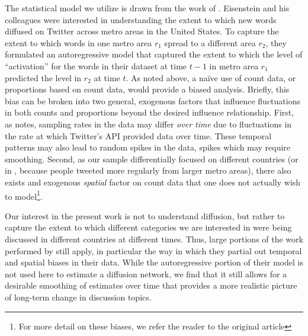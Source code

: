 The statistical model we utilize is drawn from the work of \cite{eisenstein_diffusion_2014}. Eisenstein and his colleagues were interested in understanding the extent to which new words diffused on Twitter across metro areas in the United States.  To capture the extent to which words in one metro area $r_1$ spread to a different area $r_2$, they formulated an autoregressive model that captured the extent to which the level of ``activation'' for the words in their dataset at time $t-1$ in metro area $r_1$ predicted the level in $r_2$ at time $t$.   As noted above, a na\"{i}ve use of count data, or proportions based on count data, would provide a biased analysis.  Briefly, this bias can be broken into two general, exogenous factors that influence fluctuations in both counts and proportions beyond the desired influence relationship.  First, as \cite{eisenstein_diffusion_2014} notes, sampling rates in the data may differ \emph{over time} due to fluctuations in the rate at which Twitter's API provided data over time.  These temporal patterns may also lead to random spikes in the data, spikes which may require smoothing.  Second, as our sample differentially focused on different countries (or in \cite{eisenstein_diffusion_2014}, because people tweeted more regularly from larger metro areas), there also exists and exogenous \emph{spatial} factor on count data that one does not actually wish to model\footnote{For more detail on these biases, we refer the reader to the original article}.

Our interest in the present work is not to understand diffusion, but rather to capture the extent to which different categories we are interested in were being discussed in different countries at different times.  Thus, large portions of the work performed by \cite{eisenstein_diffusion_2014} still apply, in particular the way in which they partial out temporal and spatial biases in their data. While the autoregressive portion of their model is not used here to estimate a diffusion network, we find that it still allows for a desirable smoothing of estimates over time that provides a more realistic picture of long-term change in discussion topics.  

